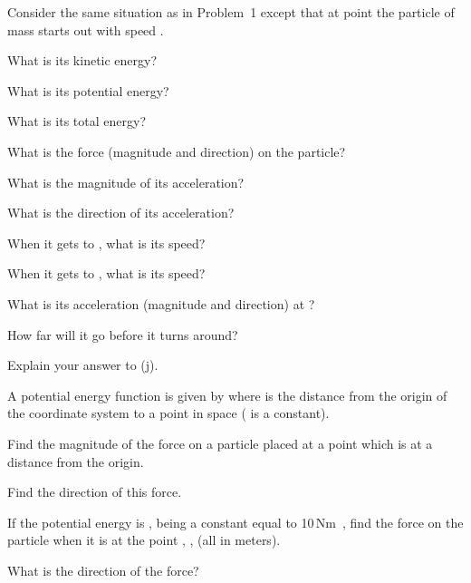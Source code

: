 {\begin{one-digit-list}
\item [3.] Consider the same situation as in Problem~1 except that at point
 the particle of mass  starts out with speed .
\begin{one-digit-list}
\item [a.] What is its kinetic energy?
\item [b.] What is its potential energy?
\item [c.] What is its total energy?
\item [d.] What is the force (magnitude and direction) on the particle?
\item [e.] What is the magnitude of its acceleration?
\item [f.] What is the direction of its acceleration?
\item [g.] When it gets to , what is its speed?
\item [h.] When it gets to , what is its speed?
\item [i.] What is its acceleration (magnitude and direction) at ?
\item [j.] How far will it go before it turns around?
\item [k.] Explain your answer to (j).
\end{one-digit-list}

\item [4.] A potential energy function is given by 
where  is the distance from the origin of the coordinate system to a point
in space ( is a constant).
\begin{one-digit-list}
\item [a.] Find the magnitude of the force on a particle placed at a point
which is at a distance  from the origin.
\item [b.] Find the direction of this force.
\end{one-digit-list}

\item [5.] \NullItem
\begin{one-digit-list}
\item [a.] If the potential energy is ,  being a constant
equal to 10\,N\unit{m}, find the force on the particle when it is at the point
, ,  (all in meters).
\item [b.] What is the direction of the force?
\end{one-digit-list}
\end{one-digit-list}

}
